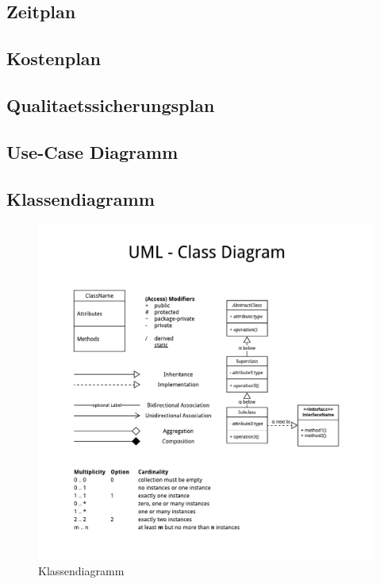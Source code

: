 \documentclass[11pt, a4paper]{article}
\begin{document}
    \subsection{Zeitplan}
      \newpage
    \subsection{Kostenplan}
      \newpage
    \subsection{Qualitaetssicherungsplan}
      \newpage
    \subsection{Use-Case Diagramm}
      \newpage
    \subsection{Klassendiagramm}
      \begin{figure}[h!]
        \includegraphics[width=\linewidth]{fig/UML_Classdiagram.pdf}
        \caption{Klassendiagramm}
        \label{fig:classdiagram}
      \end{figure}
      \newpage
\end{document}
